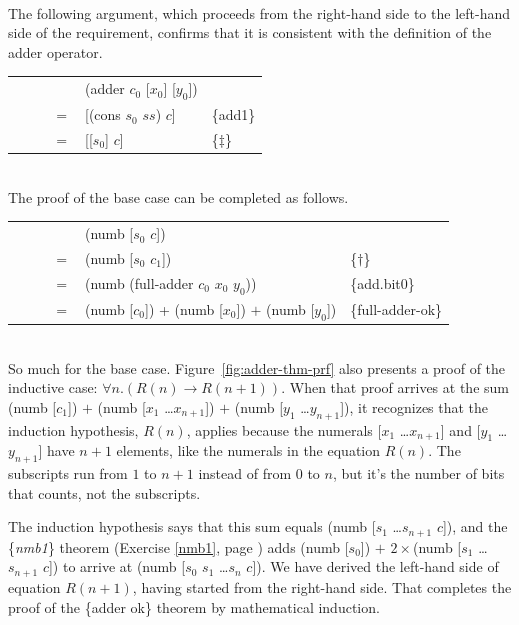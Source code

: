 ~~\vspace{2mm}\\
The following argument, which proceeds
from the right-hand side to the left-hand side of the requirement,
confirms that it is consistent with the definition of the \textsf{adder} operator.\\
\begin{tabular}{rll}
 ~~~~~~~~& \textsf{(adder $c_0$ [$x_0$] [$y_0$])} & \\
$=$ & \textsf{[(cons $s_0$ $ss$) $c$]}       & \{add1\}      \\
$=$ & \textsf{[[$s_0$] $c$]}                 & \{$\ddagger$\}\\
\end{tabular}
~~\vspace{2mm}\\
The proof of the base case can be completed as follows.\\
\begin{tabular}{rll}
 ~~~~~~~~& \textsf{(numb [$s_0$ $c$])}                               &                   \\
$=$ & (\textsf{numb [$s_0$ $c_1$])}                             & \{$\dagger$\}    \\
$=$ & \textsf{(numb (full-adder $c_0$ $x_0$ $y_0$))}            & \{add.bit0\}      \\
$=$ & \textsf{(numb [$c_0$])} + \textsf{(numb [$x_0$])} $+$ \textsf{(numb [$y_0$])} & \{full-adder-ok\} \\
\end{tabular}\\

So much for the base case.
Figure~\ref{fig:adder-thm-prf} also presents
a proof of the inductive case: $\forall n.(R(n) \rightarrow R(n+1))$.
When that proof arrives at the sum
\textsf{(numb [$c_1$])} $+$ \textsf{(numb [$x_1$ \dots $x_{n+1}$])} $+$ \textsf{(numb [$y_1$ \dots $y_{n+1}$])},
it recognizes that the induction hypothesis, $R(n)$, applies because
the numerals \textsf{[$x_1$ \dots $x_{n+1}$]} and \textsf{[$y_1$ \dots $y_{n+1}$]} have $n+1$
elements, like the numerals in the equation $R(n)$.
The subscripts run from $1$ to $n+1$ instead of from $0$ to $n$,
but it's the number of bits that counts, not the subscripts.

The induction hypothesis says that this sum equals
\textsf{(numb [$s_1$ \dots $s_{n+1}$ $c$])}, and
the \{\emph{nmb1}\} theorem (Exercise \ref{nmb1}, page \pageref{nmb1})
adds \textsf{(numb [$s_0$])} $+$ $2\times$\textsf{(numb [$s_1$ \dots $s_{n+1}$ $c$])}
to arrive at \textsf{(numb [$s_0$ $s_1$ \dots $s_{n}$ $c$])}.
We have derived the left-hand side
of equation $R(n+1)$, having started from the right-hand side.
That completes the proof of the \{adder ok\} theorem
by mathematical induction.

